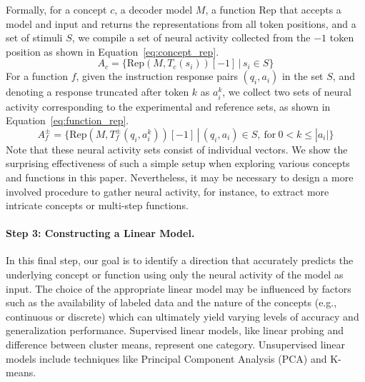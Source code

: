 Formally, for a concept $c$, a decoder model $M$, a function $\text{Rep}$ that accepts a model and input and returns the representations from all token positions, and a set of stimuli $S$, we compile a set of neural activity collected from the $-1$ token position as shown in Equation~\ref{eq:concept_rep}.
\begin{equation}
\label{eq:concept_rep}
A_c = \{ \text{Rep}(M, T_c(s_i))[-1] \, | \, s_i \in S\}
\end{equation}
For a function $f$, given the instruction response pairs $(q_i, a_i)$ in the set $S$, and denoting a response truncated after token $k$ as $a_i^k$, we collect two sets of neural activity corresponding to the experimental and reference sets, as shown in Equation~\ref{eq:function_rep}.
\begin{equation}
\label{eq:function_rep}
A_f^\pm = \{ \text{Rep}(M, T_f^\pm(q_i, a_i^k))[-1] \, | \, (q_i, a_i) \in S,~\text{for}~0 < k \le |a_i| \}
\end{equation}
Note that these neural activity sets consist of individual vectors. We show the surprising effectiveness of such a simple setup when exploring various concepts and functions in this paper. Nevertheless, it may be necessary to design a more involved procedure to gather neural activity, for instance, to extract more intricate concepts or multi-step functions.

\paragraph{Step 3: Constructing a Linear Model.}
In this final step, our goal is to identify a direction that accurately predicts the underlying concept or function using only the neural activity of the model as input. The choice of the appropriate linear model may be influenced by factors such as the availability of labeled data and the nature of the concepts (e.g., continuous or discrete) which can ultimately yield varying levels of accuracy and generalization performance. Supervised linear models, like linear probing and difference between cluster means, represent one category. Unsupervised linear models include techniques like Principal Component Analysis (PCA) and K-means. 

